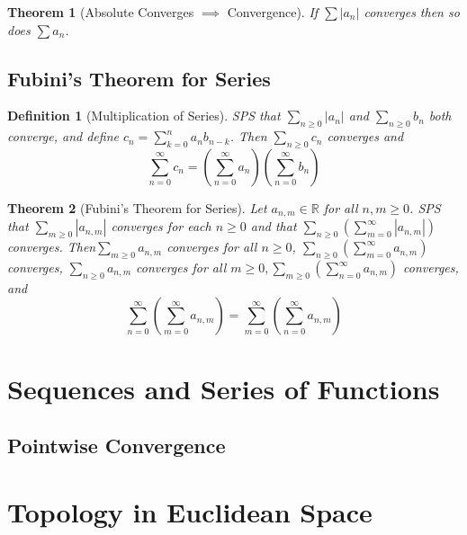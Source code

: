 \documentclass[11pt, oneside]{book}
\theoremstyle{break}
\newtheorem{thm}{Theorem}[section]
\newtheorem{defn}{Definition}[section]
\newcommand{\bb}[1]{\mathbb{#1}}		%
\begin{document}
\begin{thm}[Absolute Converges $\implies$ Convergence]
	If $\sum |a_n|$ converges then so does $\sum a_n$.
\end{thm}


\section{Fubini's Theorem for Series}
\begin{defn}[Multiplication of Series]
	SPS that $\sum_{n \geq 0} |a_n|$ and $\sum_{n \geq 0} b_n$ both converge, and define $c_n = \sum\limits_{k = 0}^{n} a_n b_{n - k}$. Then $\sum_{n \geq 0} c_n$ converges and
	\[
		\sum_{n = 0}^{\infty} c_n = \left( \sum_{n = 0}^{\infty} a_n \right) \left(\sum_{n = 0}^{\infty} b_n \right)
	\]
\end{defn}

\begin{thm}[Fubini's Theorem for Series]
	Let $a_{n, m} \in \bb{R}$ for all $n, m \geq 0$. SPS that $\sum_{m \geq 0} |a_{n, m}|$ converges for each $n \geq 0$ and that $\sum\limits_{n \geq 0} \left(\sum\limits_{m = 0}^{\infty} |a_{n, m}| \right)$ converges. Then$\sum_{m \geq 0} a_{n, m}$ converges for all $n \geq 0$, $\sum\limits_{n \geq 0} \left( \sum\limits_{m = 0}^{\infty} a_{n, m} \right)$ converges, $\sum_{n \geq 0} a_{n, m}$ converges for all $m \geq 0, \sum\limits_{m \geq 0} \left(\sum\limits_{n = 0}^{\infty} a_{n, m} \right)$ converges, and
	\[
		\sum_{n = 0}^{\infty} \left(\sum_{m = 0}^{\infty} a_{n, m} \right) = \sum_{m = 0}^{\infty} \left(\sum_{n = 0}^{\infty} a_{n, m} \right)
	\]
\end{thm}

\chapter{Sequences and Series of Functions}

\section{Pointwise Convergence}

\chapter{Topology in Euclidean Space}
\end{document}

